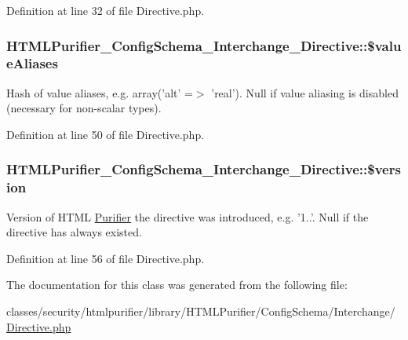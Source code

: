 Definition at line 32 of file Directive.\+php.

\hypertarget{classHTMLPurifier__ConfigSchema__Interchange__Directive_aff1f970448156697608aa14a8bcef760}{
\subsubsection[{\$value\+Aliases}]{\setlength{\rightskip}{0pt plus 5cm}H\+T\+M\+L\+Purifier\+\_\+\+Config\+Schema\+\_\+\+Interchange\+\_\+\+Directive\+::\$value\+Aliases}}\label{classHTMLPurifier__ConfigSchema__Interchange__Directive_aff1f970448156697608aa14a8bcef760}
Hash of value aliases, e.\+g. array('alt' =$>$ 'real'). Null if value aliasing is disabled (necessary for non-\/scalar types). 

Definition at line 50 of file Directive.\+php.

\hypertarget{classHTMLPurifier__ConfigSchema__Interchange__Directive_a330b67667a9b8152679b906bbdcd58c1}{
\subsubsection[{\$version}]{\setlength{\rightskip}{0pt plus 5cm}H\+T\+M\+L\+Purifier\+\_\+\+Config\+Schema\+\_\+\+Interchange\+\_\+\+Directive\+::\$version}}\label{classHTMLPurifier__ConfigSchema__Interchange__Directive_a330b67667a9b8152679b906bbdcd58c1}
Version of H\+T\+M\+L \hyperlink{classPurifier}{Purifier} the directive was introduced, e.\+g. '1..'. Null if the directive has always existed. 

Definition at line 56 of file Directive.\+php.



The documentation for this class was generated from the following file\+:\begin{DoxyCompactItemize}
\item 
classes/security/htmlpurifier/library/\+H\+T\+M\+L\+Purifier/\+Config\+Schema/\+Interchange/\hyperlink{Directive_8php}{Directive.\+php}\end{DoxyCompactItemize}
